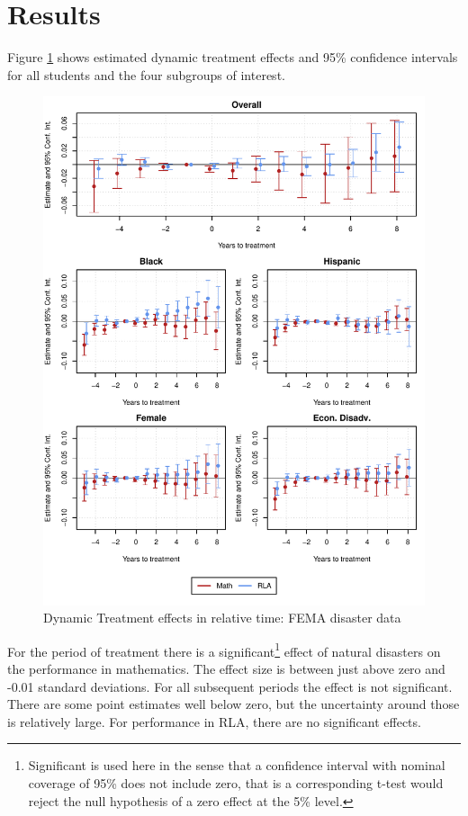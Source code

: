 \section{Results} \label{Results}

Figure \ref{ResultsPlot} shows estimated dynamic treatment effects and 95\% confidence intervals for all students and the four subgroups of interest. 

\begin{figure}[!h]
	\centering
	\includegraphics[scale=1]{"../Code & Data/ResultsPlot.pdf"}
	\caption{Dynamic Treatment effects in relative time: FEMA disaster data}
	\label{ResultsPlot}
\end{figure}


For the period of treatment there is a significant\footnote{Significant is used here in the sense that a confidence interval with nominal coverage of 95\% does not include zero, that is a corresponding t-test would reject the null hypothesis of a zero effect at the 5\% level.} effect of natural disasters on the performance in mathematics. The effect size is between just above zero and -0.01 standard deviations. For all subsequent periods the effect is not significant. There are some point estimates well below zero, but the uncertainty around those is relatively large. For performance in RLA, there are no significant effects.


